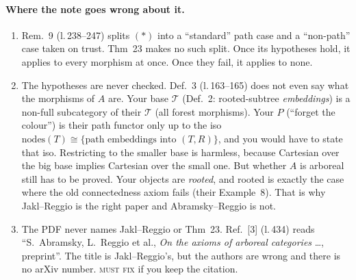\documentclass[11pt]{article}
\newcommand{\iss}[1]{\textsc{#1}}
\newcommand{\nodes}{\mathrm{nodes}}
\begin{document}
\paragraph{Where the note goes wrong about it.}
\begin{enumerate}[leftmargin=*]
\item Rem.~9 (l.\,238--247) splits $(\ast)$ into a ``standard'' path case and a ``non-path''
case taken on trust. Thm~23 makes no such split. Once its hypotheses hold, it applies to every
morphism at once. Once they fail, it applies to none.
\item The hypotheses are never checked. Def.~3 (l.\,163--165) does not even say what the morphisms
of $A$ are. Your base $\mathcal T$ (Def.~2: rooted-subtree \emph{embeddings}) is a non-full
subcategory of their $\mathcal T$ (all forest morphisms). Your $P$ (``forget the colour'') is
their path functor only up to the iso $\nodes(T)\cong\{\text{path embeddings into }(T,R)\}$, and
you would have to state that iso. Restricting to the smaller base is harmless, because Cartesian
over the big base implies Cartesian over the small one. But whether $A$ is arboreal still has to be
proved. Your objects are \emph{rooted}, and rooted is exactly the case where the old connectedness
axiom fails (their Example~8). That is why Jakl--Reggio is the right paper and Abramsky--Reggio is
not.
\item The PDF never names Jakl--Reggio or Thm~23. Ref.~[3] (l.\,434) reads ``S.~Abramsky,
L.~Reggio et al., \emph{On the axioms of arboreal categories} \dots, preprint''. The title is
Jakl--Reggio's, but the authors are wrong and there is no arXiv number. \iss{must fix} if you keep
the citation.
\end{enumerate}
\end{document}
